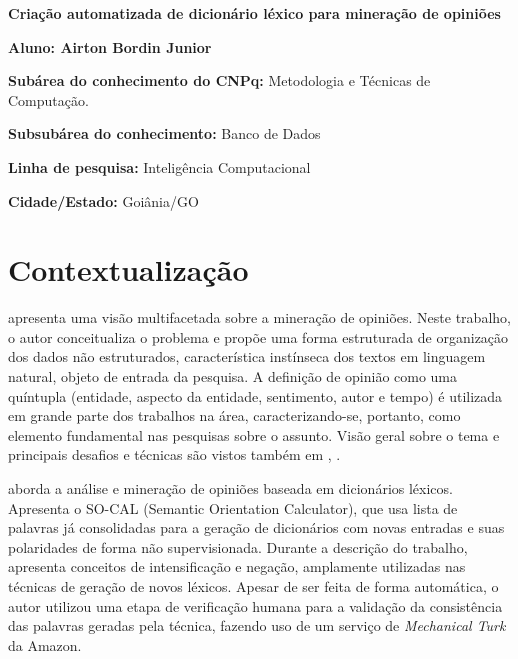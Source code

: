 \documentclass[a4paper,11pt]{article}
\begin{document}
\selectfont



\begin{framed}
\begin{center}
\textbf{\Large{Criação automatizada de dicionário léxico para mineração de opiniões}}

\textbf{Aluno: Airton Bordin Junior}
\end{center}

\textbf{Subárea do conhecimento do CNPq:} Metodologia e Técnicas de Computação.

\textbf{Subsubárea do conhecimento:} Banco de Dados

\textbf{Linha de pesquisa:} Inteligência Computacional

\textbf{Cidade/Estado:} Goiânia/GO

\end{framed}

\section{Contextualização}
\cite{liu2010multifaceted} apresenta uma visão multifacetada sobre a mineração de opiniões. Neste trabalho, o autor conceitualiza o problema e propõe uma forma estruturada de organização dos dados não estruturados, característica instínseca dos textos em linguagem natural, objeto de entrada da pesquisa. A definição de opinião como uma quíntupla (entidade, aspecto da entidade, sentimento, autor e tempo) é utilizada em grande parte dos trabalhos na área, caracterizando-se, portanto, como elemento fundamental nas pesquisas sobre o assunto. Visão geral sobre o tema e principais desafios e técnicas são vistos também em \cite{mohammad2016challenges}, \cite{ghaleb2016survey}.

\cite{taboada2011lexicon} aborda a análise e mineração de opiniões baseada em dicionários léxicos. Apresenta o SO-CAL (Semantic Orientation Calculator), que usa lista de palavras já consolidadas para a geração de dicionários com novas entradas e suas polaridades de forma não supervisionada. Durante a descrição do trabalho, apresenta conceitos de intensificação e negação, amplamente utilizadas nas técnicas de geração de novos léxicos. Apesar de ser feita de forma automática, o autor utilizou uma etapa de verificação humana para a validação da consistência das palavras geradas pela técnica, fazendo uso de um serviço de\emph{ Mechanical Turk} da Amazon. 
\end{document}
